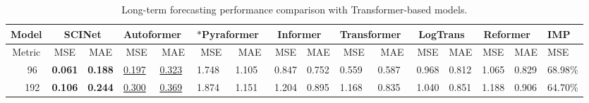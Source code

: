 \documentclass{article}
\begin{document}
\begin{table*}[h]
\caption{Long-term forecasting performance comparison with Transformer-based models. }
\centering
\scriptsize
\resizebox{\textwidth}{!}
{
\begin{tabular}{ccllllllllllllll|l}
\hline
\multicolumn{2}{c}{Model}                                                     & \multicolumn{2}{c}{\textbf{SCINet}}                                    & \multicolumn{2}{c}{Autoformer~\cite{Wu2021AutoformerDT}}   & \multicolumn{2}{c}{$*$Pyraformer~\cite{Liu2022Pyraformer}}                                          & \multicolumn{2}{c}{Informer~\cite{Zhou2020InformerBE}}                      & \multicolumn{2}{c}{Transformer~\cite{vaswani2017attention}}                   & \multicolumn{2}{c}{LogTrans~\cite{li2019enhancing}}                      & \multicolumn{2}{c|}{Reformer~\cite{kitaev2019reformer}} & \textbf{IMP}                               \\ \hline
\multicolumn{2}{c}{Metric}                                                                           & \multicolumn{1}{c}{MSE}            & \multicolumn{1}{c}{MAE}           & \multicolumn{1}{c}{MSE}            & \multicolumn{1}{c}{MAE} & \multicolumn{1}{c}{MSE}            & \multicolumn{1}{c}{MAE}            & \multicolumn{1}{c}{MSE} & \multicolumn{1}{c}{MAE} & \multicolumn{1}{c}{MSE} & \multicolumn{1}{c}{MAE} & \multicolumn{1}{c}{MSE} & \multicolumn{1}{c}{MAE} & \multicolumn{1}{c}{MSE}  & \multicolumn{1}{c|}{MAE}  & MSE \\ \hline
\multicolumn{1}{c|}{}                                                                          & 96  & \textbf{0.061}                     & \textbf{0.188}                    & {\color[RGB]{0, 100, 148} \underline{0.197}} & {\color[RGB]{0, 100, 148} \underline{0.323}}  & 1.748 &  1.105& 0.847                   & 0.752                   & 0.559                   & 0.587                   & 0.968                   & 0.812                   & 1.065                    & 0.829                     & {\color[RGB]{230, 57, 70} 68.98\%}   \\
\multicolumn{1}{c|}{}                                                                          & 192 & \textbf{0.106}                     & \textbf{0.244}                    & {\color[RGB]{0, 100, 148} \underline{0.300}} & {\color[RGB]{0, 100, 148} \underline{0.369}}  &  1.874 &  1.151& 1.204                   & 0.895                   & 1.168                   & 0.835                   & 1.040                   & 0.851                   & 1.188                    & 0.906                     & {\color[RGB]{230, 57, 70} 64.70\%}   \\

\end{tabular}}
\end{table*}
\end{document}
